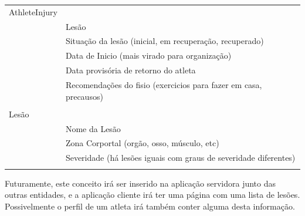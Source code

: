 \begin{tabular}{ll}
	AthleteInjury&\\
	&Lesão\\
	&Situação da lesão (inicial, em recuperação, recuperado)\\
	&Data de Inicio (mais virado para organização)\\
	&Data provisória de retorno do atleta\\
	&Recomendações do fisio (exercicios para fazer em casa, precausos)\\
	&\\
	Lesão&\\
	&Nome da Lesão\\
	&Zona Corportal (orgão, osso, músculo, etc)\\
	&Severidade (há lesões iguais com graus de severidade diferentes)\\
	&\\
\end{tabular}


Futuramente, este conceito irá ser inserido na aplicação servidora junto das outras entidades, e a aplicação cliente irá ter uma página com uma lista de lesões. Possivelmente o perfil de um atleta irá também conter alguma desta informação.
